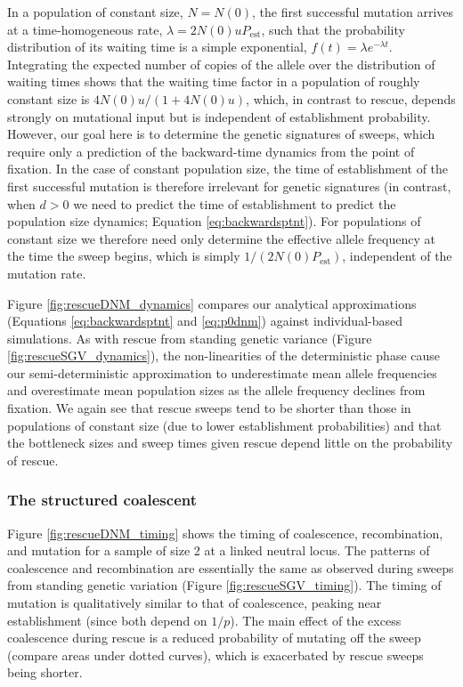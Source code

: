 \documentclass[]{article}
\begin{document}
In a population of constant size, $N=N(0)$, the first successful mutation arrives at a time-homogeneous rate, $\lambda=2 N(0) u P_\mathrm{est}$, such that the probability distribution of its waiting time is a simple exponential, $f(t) = \lambda e^{-\lambda t}$.
Integrating the expected number of copies of the allele over the distribution of waiting times shows that the waiting time factor in a population of roughly constant size is $4N(0)u/(1+4N(0)u)$, which, in contrast to rescue, depends strongly on mutational input but is independent of establishment probability.
However, our goal here is to determine the genetic signatures of sweeps, which require only a prediction of the backward-time dynamics from the point of fixation. 
In the case of constant population size, the time of establishment of the first successful mutation is therefore irrelevant for genetic signatures (in contrast, when $d>0$ we need to predict the time of establishment to predict the population size dynamics; Equation \ref{eq:backwardsptnt}). 
For populations of constant size we therefore need only determine the effective allele frequency at the time the sweep begins, which is simply $1/(2N(0)P_\mathrm{est})$, independent of the mutation rate.

Figure \ref{fig:rescueDNM_dynamics} compares our analytical approximations (Equations \ref{eq:backwardsptnt} and \ref{eq:p0dnm}) against individual-based simulations.
As with rescue from standing genetic variance (Figure \ref{fig:rescueSGV_dynamics}), the non-linearities of the deterministic phase cause our semi-deterministic approximation to underestimate mean allele frequencies and overestimate mean population sizes as the allele frequency declines from fixation.
We again see that rescue sweeps tend to be shorter than those in populations of constant size (due to lower establishment probabilities) and that the bottleneck sizes and sweep times given rescue depend little on the probability of rescue.

\subsubsection*{The structured coalescent}

Figure \ref{fig:rescueDNM_timing} shows the timing of coalescence, recombination, and mutation for a sample of size 2 at a linked neutral locus. 
The patterns of coalescence and recombination are essentially the same as observed during sweeps from standing genetic variation (Figure \ref{fig:rescueSGV_timing}).
The timing of mutation is qualitatively similar to that of coalescence, peaking near establishment (since both depend on $1/p$).
The main effect of the excess coalescence during rescue is a reduced probability of mutating off the sweep (compare areas under dotted curves), which is exacerbated by rescue sweeps being shorter.
\end{document}
